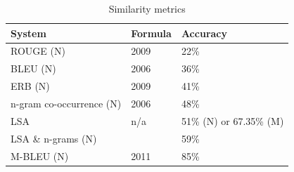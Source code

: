 \begin{table}[h!]
\centering
\caption{Similarity metrics}
\label{sim}
\begin{tabular}{|l|l|l|}
\hline
 System & Formula & Accuracy \\ \hline
 ROUGE (N)& 2009 & 22\%  \\ \hline
 BLEU (N)& 2006 & 36\% \\ \hline
 ERB (N)& 2009 & 41\%  \\ \hline
 n-gram co-occurrence (N)& 2006 & 48\% \\ \hline
 LSA & n/a & 51\% (N) or 67.35\% (M) \\ \hline
 LSA \& n-grams (N)&  & 59\%  \\ \hline
 M-BLEU (N)& 2011 & 85\% \\ \hline
\end{tabular}
\end{table}